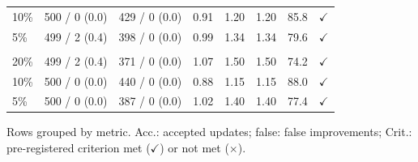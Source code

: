 \begin{table}[!htb]
\begin{tabular}{@{}lllrrrrc@{}}
10\% & 500 / 0 (0.0) & 429 / 0 (0.0) & 0.91 & 1.20 & 1.20 & 85.8 & $\checkmark$ \\
5\% & 499 / 2 (0.4) & 398 / 0 (0.0) & 0.99 & 1.34 & 1.34 & 79.6 & $\checkmark$ \\
\addlinespace
\multicolumn{8}{@{}l}{\textit{macro-$F_1$}} \\
20\% & 499 / 2 (0.4) & 371 / 0 (0.0) & 1.07 & 1.50 & 1.50 & 74.2 & $\checkmark$ \\
10\% & 500 / 0 (0.0) & 440 / 0 (0.0) & 0.88 & 1.15 & 1.15 & 88.0 & $\checkmark$ \\
5\% & 500 / 0 (0.0) & 387 / 0 (0.0) & 1.02 & 1.40 & 1.40 & 77.4 & $\checkmark$ \\
\bottomrule
\end{tabular}

\vspace{2pt}
\parbox{\linewidth}{\justifying\scriptsize *Rows grouped by metric. Acc.: accepted updates; false: false improvements; Crit.: pre-registered criterion met ($\checkmark$) or not met ($\times$).}
\end{table}
